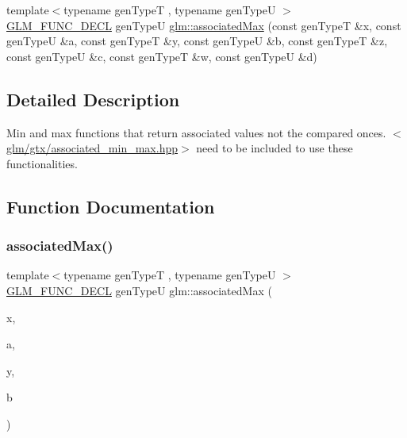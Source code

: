 \begin{DoxyCompactItemize}
\item 
{\footnotesize template$<$typename gen\+TypeT , typename gen\+TypeU $>$ }\\\hyperlink{setup_8hpp_ab2d052de21a70539923e9bcbf6e83a51}{G\+L\+M\+\_\+\+F\+U\+N\+C\+\_\+\+D\+E\+CL} gen\+TypeU \hyperlink{group__gtx__associated__min__max_ga23f2bce9c1d6f775cd1f7bf36525286e}{glm\+::associated\+Max} (const gen\+TypeT \&x, const gen\+TypeU \&a, const gen\+TypeT \&y, const gen\+TypeU \&b, const gen\+TypeT \&z, const gen\+TypeU \&c, const gen\+TypeT \&w, const gen\+TypeU \&d)
\end{DoxyCompactItemize}


\subsection{Detailed Description}
Min and max functions that return associated values not the compared onces. $<$\hyperlink{associated__min__max_8hpp}{glm/gtx/associated\+\_\+min\+\_\+max.\+hpp}$>$ need to be included to use these functionalities. 



\subsection{Function Documentation}
\mbox{\label{group__gtx__associated__min__max_gaee554495240b93d80492b3d2312ede1d}} 
\subsubsection{\texorpdfstring{associated\+Max()}{associatedMax()}\hspace{0.1cm}{\footnotesize\ttfamily [1/3]}}
{\footnotesize\ttfamily template$<$typename gen\+TypeT , typename gen\+TypeU $>$ \\
\hyperlink{setup_8hpp_ab2d052de21a70539923e9bcbf6e83a51}{G\+L\+M\+\_\+\+F\+U\+N\+C\+\_\+\+D\+E\+CL} gen\+TypeU glm\+::associated\+Max (\begin{DoxyParamCaption}\item[{const gen\+TypeT \&}]{x,  }\item[{const gen\+TypeU \&}]{a,  }\item[{const gen\+TypeT \&}]{y,  }\item[{const gen\+TypeU \&}]{b }\end{DoxyParamCaption})}


